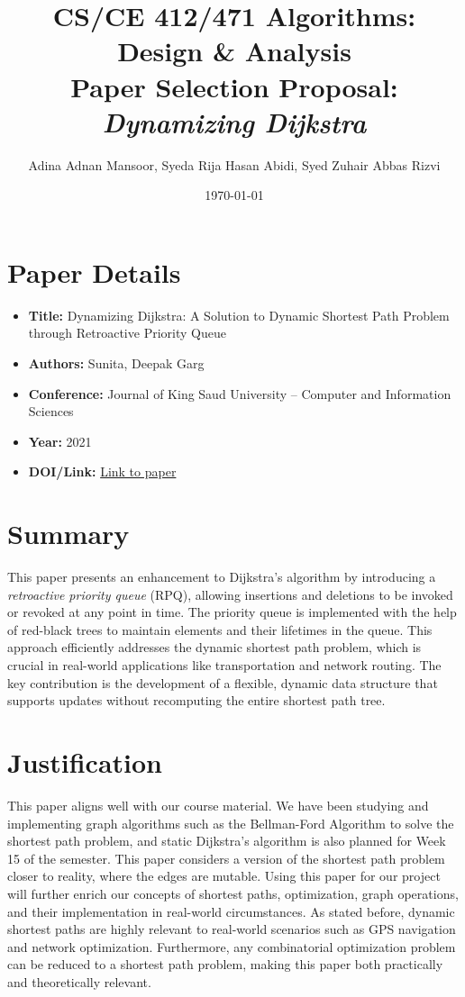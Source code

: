 \documentclass{article}
\title{
CS/CE 412/471 Algorithms: Design \& Analysis\\Paper Selection Proposal: \textit{Dynamizing Dijkstra}}
\author {Adina Adnan Mansoor, Syeda Rija Hasan Abidi, Syed Zuhair Abbas Rizvi}
\date{\today}
\begin{document}
\maketitle

\section{Paper Details}
\begin{itemize}
\setlength{\itemsep}{1pt}
    \item \textbf{Title:} Dynamizing Dijkstra: A Solution to Dynamic Shortest Path Problem through Retroactive Priority Queue
    \item \textbf{Authors:} Sunita, Deepak Garg
    \item \textbf{Conference:} Journal of King Saud University – Computer and Information Sciences
    \item \textbf{Year:} 2021
    \item \textbf{DOI/Link:} \href{https://www.sciencedirect.com/science/article/pii/S1319157817303828}{Link to paper}
\end{itemize}

\section{Summary}
This paper presents an enhancement to Dijkstra's algorithm by introducing a \textit{retroactive priority queue} (RPQ), allowing insertions and deletions to be invoked or revoked at any point in time. The priority queue is implemented with the help of red-black trees to maintain elements and their lifetimes in the queue. This approach efficiently addresses the dynamic shortest path problem, which is crucial in real-world applications like transportation and network routing. The key contribution is the development of a flexible, dynamic data structure that supports updates without recomputing the entire shortest path tree.

\section{Justification}
This paper aligns well with our course material. We have been studying and implementing graph algorithms such as the Bellman-Ford Algorithm to solve the shortest path problem, and static Dijkstra's algorithm is also planned for Week 15 of the semester. This paper considers a version of the shortest path problem closer to reality, where the edges are mutable. Using this paper for our project will further enrich our concepts of shortest paths, optimization, graph operations, and their implementation in real-world circumstances. As stated before, dynamic shortest paths are highly relevant to real-world scenarios such as GPS navigation and network optimization. Furthermore, any combinatorial optimization problem can be reduced to a shortest path problem, making this paper both practically and theoretically relevant.
\end{document}
